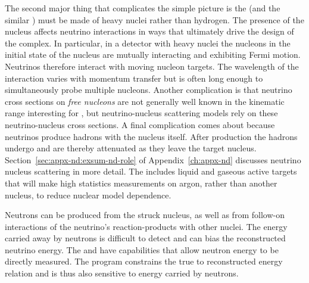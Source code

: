 The second major thing that complicates the simple picture is the  (and the similar ) must be made of heavy nuclei rather than hydrogen. %
The presence of the nucleus affects %
neutrino interactions in ways that ultimately drive the design of the   complex. In particular, in a detector with heavy nuclei the nucleons in the initial state of the nucleus are mutually interacting and exhibiting Fermi motion. Neutrinos therefore interact with moving nucleon targets. The wavelength of the interaction varies with momentum transfer but is often long enough to simultaneously probe multiple nucleons. Another complication is that neutrino cross sections on {\em free nucleons} are not generally well known in the kinematic range interesting for , but neutrino-nucleus scattering models rely on these neutrino-nucleus cross sections. A final complication comes about because neutrinos produce hadrons with the nucleus itself. After production the hadrons undergo  and are thereby attenuated as they leave the target nucleus. Section~\ref{sec:appx-nd:exsum-nd-role} of Appendix~\ref{ch:appx-nd} discusses neutrino nucleus scattering in more detail. The   includes liquid and gaseous active targets that will make high statistics measurements on argon, rather than another nucleus, to reduce nuclear model dependence. 


Neutrons can be produced from the struck nucleus, as well as from follow-on interactions of the neutrino's reaction-products with other nuclei. The energy carried away by neutrons is difficult to detect and can bias the reconstructed neutrino energy. The  and  have capabilities that allow neutron energy to be directly measured. The  program constrains the true to reconstructed energy relation and is thus also sensitive to energy carried by neutrons.

